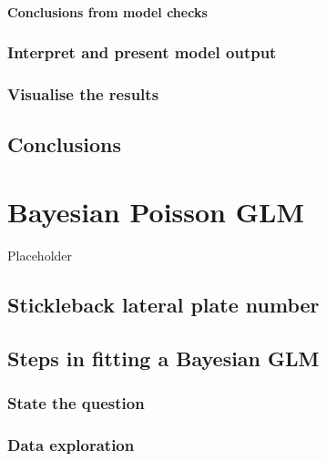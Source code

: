 \documentclass[
]{book}
\begin{document}
\hypertarget{conclusions-from-model-checks}{%
\subsubsection{Conclusions from model
checks}\label{conclusions-from-model-checks}}

\hypertarget{interpret-and-present-model-output}{%
\subsection{Interpret and present model
output}\label{interpret-and-present-model-output}}

\hypertarget{visualise-the-results}{%
\subsection{Visualise the results}\label{visualise-the-results}}

\hypertarget{conclusions-1}{%
\section{Conclusions}\label{conclusions-1}}

\hypertarget{pois-glm}{%
\chapter{Bayesian Poisson GLM}\label{pois-glm}}

Placeholder

\hypertarget{ga-plate}{%
\section{Stickleback lateral plate number}\label{ga-plate}}

\hypertarget{pois-glm-steps}{%
\section{Steps in fitting a Bayesian GLM}\label{pois-glm-steps}}

\hypertarget{ga-question}{%
\subsection{State the question}\label{ga-question}}

\hypertarget{ga-eda}{%
\subsection{Data exploration}\label{ga-eda}}
\end{document}
